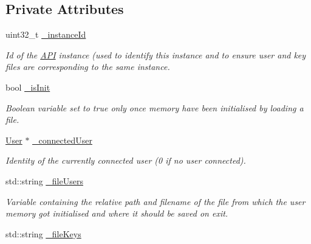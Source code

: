 \subsection*{Private Attributes}
\begin{DoxyCompactItemize}
\item 
\hypertarget{classAPI_aad1a092d6335ccc65dad4d6c8d6dad64}{}uint32\+\_\+t \hyperlink{classAPI_aad1a092d6335ccc65dad4d6c8d6dad64}{\+\_\+instance\+Id}\label{classAPI_aad1a092d6335ccc65dad4d6c8d6dad64}

\begin{DoxyCompactList}\small\item\em Id of the \hyperlink{classAPI}{A\+P\+I} instance (used to identify this instance and to ensure user and key files are corresponding to the same instance. \end{DoxyCompactList}\item 
\hypertarget{classAPI_ab7720e1ae136e01272d3b291367c6147}{}bool \hyperlink{classAPI_ab7720e1ae136e01272d3b291367c6147}{\+\_\+is\+Init}\label{classAPI_ab7720e1ae136e01272d3b291367c6147}

\begin{DoxyCompactList}\small\item\em Boolean variable set to true only once memory have been initialised by loading a file. \end{DoxyCompactList}\item 
\hypertarget{classAPI_abfdce0b863730f9ca75ce44f4de334a7}{}\hyperlink{classUser}{User} $\ast$ \hyperlink{classAPI_abfdce0b863730f9ca75ce44f4de334a7}{\+\_\+connected\+User}\label{classAPI_abfdce0b863730f9ca75ce44f4de334a7}

\begin{DoxyCompactList}\small\item\em Identity of the currently connected user (0 if no user connected). \end{DoxyCompactList}\item 
\hypertarget{classAPI_a51e01e8111ac1590a15b56227e5c5413}{}std\+::string \hyperlink{classAPI_a51e01e8111ac1590a15b56227e5c5413}{\+\_\+file\+Users}\label{classAPI_a51e01e8111ac1590a15b56227e5c5413}

\begin{DoxyCompactList}\small\item\em Variable containing the relative path and filename of the file from which the user memory got initialised and where it should be saved on exit. \end{DoxyCompactList}\item 
\hypertarget{classAPI_a7852be9f8494bddc3333f184102f47fb}{}std\+::string \hyperlink{classAPI_a7852be9f8494bddc3333f184102f47fb}{\+\_\+file\+Keys}\label{classAPI_a7852be9f8494bddc3333f184102f47fb}


\end{DoxyCompactItemize}
